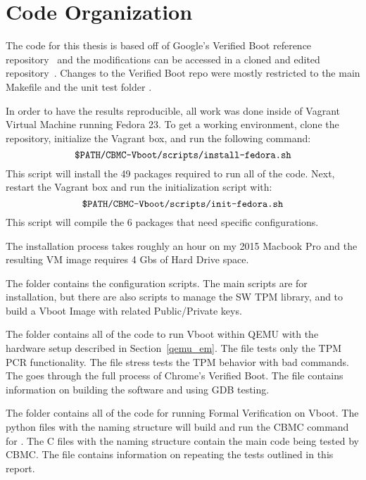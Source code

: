 \chapter{Code Organization}

The code for this thesis is based off of Google's Verified Boot reference repository~\cite{vboot-codebase} and the modifications can be accessed in a cloned and edited repository~\cite{my-repo}.
Changes to the Verified Boot repo were mostly restricted to the main Makefile and the unit test folder .

In order to have the results reproducible, all work was done inside of Vagrant Virtual Machine running Fedora 23. 
To get a working environment, clone the repository, initialize the Vagrant box, and run the following command:
\begin{equation}
    \texttt{\$PATH/CBMC-Vboot/scripts/install-fedora.sh} 
\end{equation}
This script will install the 49 packages required to run all of the code. 
Next, restart the Vagrant box and run the initialization script with:
\begin{equation}
    \texttt{\$PATH/CBMC-Vboot/scripts/init-fedora.sh} 
\end{equation}
This script will compile the 6 packages that need specific configurations.

The installation process takes roughly an hour on my 2015 Macbook Pro and the resulting VM image requires 4 Gbs of Hard Drive space. 

The  folder contains the configuration scripts.
The main scripts are for installation, but there are also scripts to manage the SW TPM library, and to build a Vboot Image with related Public/Private keys.

The  folder contains all of the code to run Vboot within QEMU with the hardware setup described in Section~\ref{qemu_em}.
The  file tests  only the TPM PCR functionality.
The  file stress tests the TPM behavior with bad commands.
The  goes through the full process of Chrome's Verified Boot.
The  file contains information on building the software and using GDB testing.

The  folder contains all of the code for running Formal Verification on Vboot.
The python files with the naming structure  will build and run the CBMC command for .
The C files with the naming structure  contain the main code being tested by CBMC\@.
The  file contains information on repeating the tests outlined in this report.


